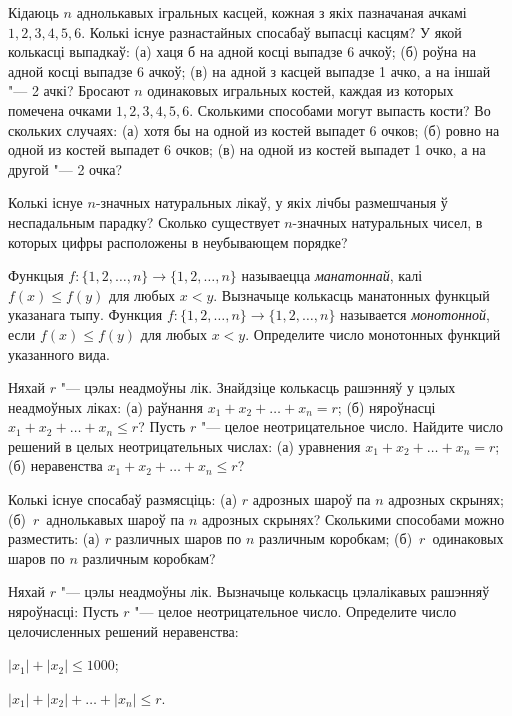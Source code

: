 \begin{problemList}
\bigskip

\problemItemSimple
{Кідаюць $n$ аднолькавых ігральных касцей, кожная з якіх пазначаная ачкамі $1, 2, 3, 4, 5, 6$.
Колькі існуе разнастайных спосабаў выпасці касцям? У якой колькасці выпадкаў:
(а) хаця б на адной косці выпадзе 6 ачкоў; (б) роўна на адной косці выпадзе 6 ачкоў;
(в) на адной з касцей выпадзе 1 ачко, а на іншай "--- 2 ачкі?}
{Бросают $n$ одинаковых игральных костей, каждая из которых помечена
очками $1, 2, 3, 4, 5, 6$. Сколькими способами могут выпасть кости?
Во скольких случаях: (а) хотя бы на одной из костей выпадет 6 очков;
(б) ровно на одной из костей выпадет 6 очков; (в) на одной из костей
выпадет 1 очко, а на другой "--- 2 очка?}

\bigskip

\problemItemSimple
{Колькі існуе $n$-значных натуральных лікаў, у якіх лічбы размешчаныя ў неспадальным парадку?}
{Сколько существует $n$-значных натуральных чисел, в
которых цифры расположены в неубывающем порядке?}

\bigskip

\problemItemSimple
{Функцыя $f \colon \{1, 2, \ldots, n\} \to \{1, 2, \ldots, n\}$
называецца \emph{манатоннай}, калі $f(x) \le f(y)$ для любых $x < y$.
Вызначыце колькасць манатонных функцый указанага тыпу.}
{Функция $f \colon \{1, 2, \ldots, n\} \to \{1, 2, \ldots, n\}$
называется \emph{монотонной}, если $f(x) \le f(y)$ для любых $x < y$.
Определите число монотонных функций указанного вида.}

\bigskip

\problemItemSimple
{Няхай $r$ "--- цэлы неадмоўны лік. Знайдзіце колькасць рашэнняў у цэлых
неадмоўных ліках: (а) раўнання $x_1 + x_2 + \ldots + x_n = r$;
(б) няроўнасці $x_1 + x_2 + \ldots + x_n \le r$?}
{Пусть $r$ "--- целое неотрицательное число. Найдите число решений в
целых неотрицательных числах: (а) уравнения
$x_1 + x_2 + \ldots + x_n = r$; (б) неравенства
$x_1 + x_2 + \ldots + x_n \le r$?}

\bigskip

\problemItemSimple
{Колькі існуе спосабаў размясціць: (а) $r$ адрозных шароў па $n$
адрозных скрынях; (б)~$r$~аднолькавых шароў па $n$ адрозных скрынях?}
{Сколькими способами можно разместить: (а) $r$ различных шаров по $n$
различным коробкам; (б)~$r$~одинаковых шаров по $n$ различным коробкам?}

\bigskip

\problemItemWithCommonPart
{Няхай $r$ "--- цэлы неадмоўны лік. Вызначыце колькасць цэлалікавых рашэнняў няроўнасці:}
{Пусть $r$ "--- целое неотрицательное число. Определите число
целочисленных решений неравенства:}
{%
\begin{belarusianEnumerate}
    \item $|x_1| + |x_2| \le 1000$;
    \item $|x_1| + |x_2| + \ldots + |x_n| \le r$.
\end{belarusianEnumerate}
}


\end{problemList}
